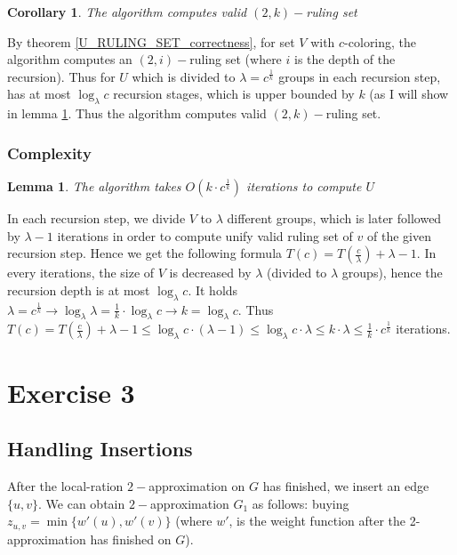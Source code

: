 \documentclass[11pt]{article}
\newtheorem{corollary}{Corollary}[theorem]
\newtheorem{lemma}[theorem]{Lemma}
\begin{document}
\begin{corollary}
\label{rulling_set_2_k}
The algorithm computes valid $(2, k)-$ruling set
\end{corollary}
By theorem \ref{U_RULING_SET_correctness}, for set $V$ with $c$-coloring, the algorithm computes an $(2, i)-$ruling set (where $i$ is the depth of the recursion). Thus for $U$ which is divided to $\lambda = c^{\frac{1}{k}}$ groups in each recursion step, has at most $\log_{\lambda}{c}$ recursion stages, which is upper bounded by $k$ (as I will show in lemma \ref{U_RULING_SET_complexity}. Thus the algorithm computes valid $(2, k)-$ruling set.


\subsubsection*{Complexity}
\begin{lemma}
\label{U_RULING_SET_complexity}
The algorithm takes $O(k \cdot c^{\frac{1}{k}})$ iterations to compute $U$
\end{lemma}
In each recursion step, we divide $V$ to $\lambda$ different groups, which is later followed by $\lambda -1$ iterations in order to compute unify valid ruling set of $v$ of the given recursion step. Hence we get the following formula $T(c) = T(\frac{c}{\lambda}) + \lambda - 1$. In every iterations, the size of $V$ is decreased by $\lambda$ (divided to $\lambda$ groups), hence the recursion depth is at most $\log_{\lambda}{c}$. It holds $\lambda = c^{\frac{1}{k}} \rightarrow \log_{\lambda}{\lambda} = \frac{1}{k} \cdot \log_{\lambda}{c} \rightarrow k = \log_{\lambda}{c}$. 
Thus $ T(c) = T(\frac{c}{\lambda}) + \lambda - 1 \le \log_{\lambda}{c} \cdot (\lambda -1)  \le \log_{\lambda}{c} \cdot \lambda \le k \cdot \lambda \le \frac{1}{k} \cdot c^{\frac{1}{k}}$ iterations.


\newpage
\section{Exercise 3}

\subsection{Handling Insertions}
After the local-ration $2-$approximation on $G$ has finished, we insert an edge $\{u,v\}$. We can obtain $2-$approximation $G_1$ as follows:
buying $z_{u,v}=\min\{w'(u), w'(v)\}$ (where $w'$, is the weight function after the 2-approximation has finished on $G$).
\end{document}
